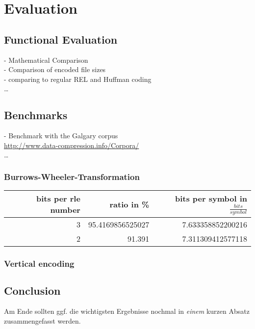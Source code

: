 
\chapter{Evaluation}
\label{ch:Evaluation}


\section{Functional Evaluation}
\label{ch:Evaluation:sec:Functional Evaluation}
- Mathematical Comparison\\
- Comparison of encoded file sizes\\
- comparing to regular REL and Huffman coding\\
\ldots

\section{Benchmarks}
\label{ch:Evaluation:sec:Benchmarks}
- Benchmark with the Galgary corpus\\
\url{http://www.data-compression.info/Corpora/} \\
\ldots

\subsection{Burrows-Wheeler-Transformation}

\par{
\begin{center}
	\begin{tabular}[p]{r|r|r}
		\label{tab:t6 run length eval bwt}
		
		bits per rle number & ratio in \% & bits per symbol in $\frac{bits}{symbol}$\\
		\hline
		3 & 95.4169856525027 & 7.633358852200216\\
		2 & 91.391 & 7.311309412577118 \\
	\end{tabular}
\end{center}
}


\subsection{Vertical encoding}
\par{


}

\section{Conclusion}
\label{ch:Evaluation:sec:Conclusion}

Am Ende sollten ggf. die wichtigsten Ergebnisse nochmal in \emph{einem} kurzen Absatz zusammengefasst werden.

